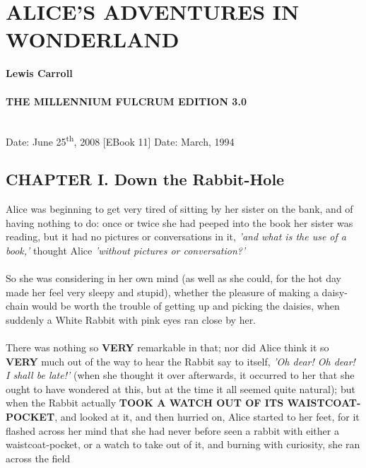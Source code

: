 \documentclass[12pt]{article}
\begin{document}
%  
% 
% 
\section{ALICE'S ADVENTURES IN WONDERLAND}\textbf{Lewis Carroll}\\\\\textbf{THE MILLENNIUM FULCRUM EDITION 3.0}\\\\\begin{itemize}
\itemPosting Date: June 25\textsuperscript{th}, 2008 [EBook 11]
\itemRelease Date: March, 1994
\end{itemize}\subsection{CHAPTER I. Down the Rabbit-Hole}Alice was beginning to get very tired of sitting by her sister on the
bank, and of having nothing to do: once or twice she had peeped into the
book her sister was reading, but it had no pictures or conversations in
it, \textit{'and what is the use of a book,'} thought Alice \textit{'without pictures or
    conversation?'}\\\\So she was considering in her own mind (as well as she could, for the
hot day made her feel very sleepy and stupid), whether the pleasure
of making a daisy-chain would be worth the trouble of getting up and
picking the daisies, when suddenly a White Rabbit with pink eyes ran
close by her.\\\\There was nothing so \textbf{VERY} remarkable in that; nor did Alice think it so
\textbf{VERY} much out of the way to hear the Rabbit say to itself, \textit{'Oh dear!
    Oh dear! I shall be late!'} (when she thought it over afterwards, it
occurred to her that she ought to have wondered at this, but at the time
it all seemed quite natural); but when the Rabbit actually \textbf{TOOK A WATCH
OUT OF ITS WAISTCOAT-POCKET}, and looked at it, and then hurried on,
Alice started to her feet, for it flashed across her mind that she had
never before seen a rabbit with either a waistcoat-pocket, or a watch
to take out of it, and burning with curiosity, she ran across the field
\end{document}

